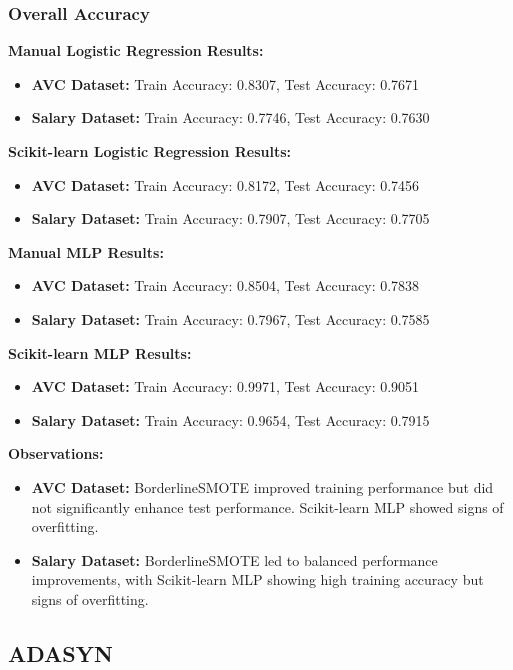 \documentclass[a4paper,12pt]{article}
\begin{document}
\subsubsection{Overall Accuracy}

\textbf{Manual Logistic Regression Results:}
\begin{itemize}
    \item \textbf{AVC Dataset:} Train Accuracy: 0.8307, Test Accuracy: 0.7671
    \item \textbf{Salary Dataset:} Train Accuracy: 0.7746, Test Accuracy: 0.7630
\end{itemize}

\textbf{Scikit-learn Logistic Regression Results:}
\begin{itemize}
    \item \textbf{AVC Dataset:} Train Accuracy: 0.8172, Test Accuracy: 0.7456
    \item \textbf{Salary Dataset:} Train Accuracy: 0.7907, Test Accuracy: 0.7705
\end{itemize}

\textbf{Manual MLP Results:}
\begin{itemize}
    \item \textbf{AVC Dataset:} Train Accuracy: 0.8504, Test Accuracy: 0.7838
    \item \textbf{Salary Dataset:} Train Accuracy: 0.7967, Test Accuracy: 0.7585
\end{itemize}

\textbf{Scikit-learn MLP Results:}
\begin{itemize}
    \item \textbf{AVC Dataset:} Train Accuracy: 0.9971, Test Accuracy: 0.9051
    \item \textbf{Salary Dataset:} Train Accuracy: 0.9654, Test Accuracy: 0.7915
\end{itemize}

\textbf{Observations:}
\begin{itemize}
    \item \textbf{AVC Dataset:} BorderlineSMOTE improved training performance but did not significantly enhance test performance. Scikit-learn MLP showed signs of overfitting.
    \item \textbf{Salary Dataset:} BorderlineSMOTE led to balanced performance improvements, with Scikit-learn MLP showing high training accuracy but signs of overfitting.
\end{itemize}

\subsection{ADASYN}
\end{document}
